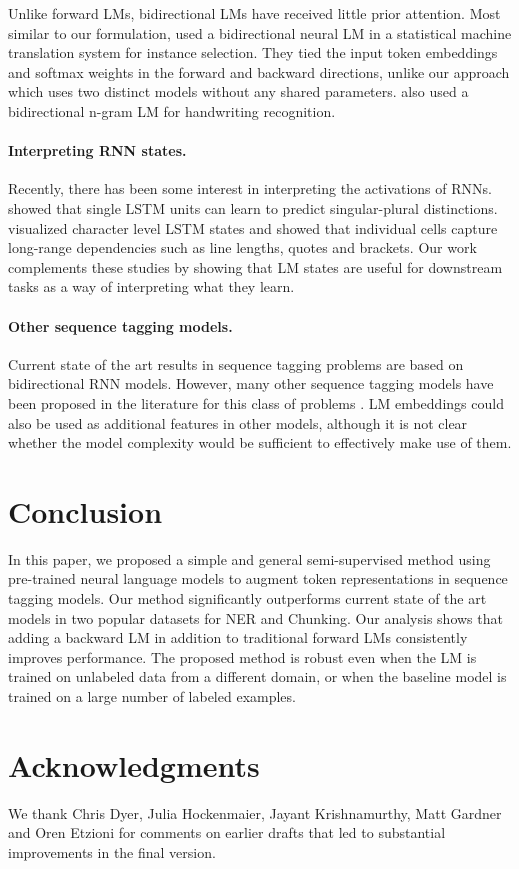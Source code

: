 \documentclass[11pt,a4paper]{article}
\begin{document}
Unlike forward LMs, bidirectional LMs have received little prior attention.
Most similar to our formulation, \citet{Peris2015ABR} used a bidirectional
neural LM in a statistical machine translation system for instance selection.
They tied the input token embeddings and softmax weights in
the forward and backward directions, unlike our approach which uses
two distinct models without any shared parameters.
\citet{frinken:12} also used a bidirectional n-gram LM for
handwriting recognition.



\paragraph{Interpreting RNN states.}
Recently, there has been some interest in interpreting the activations of RNNs. \citet{Linzen2016AssessingTA} showed that single LSTM units
can learn to predict singular-plural distinctions.  \citet{Karpathy2015VisualizingAU} visualized character level LSTM states and showed that individual cells capture long-range dependencies such as line lengths, quotes and brackets.  Our work complements these studies by showing that LM states are useful for downstream tasks as a way of interpreting what they learn.

\paragraph{Other sequence tagging models.}
Current state of the art results in sequence tagging problems are based on bidirectional RNN models.
However, many other sequence tagging models have been proposed in the literature for this class of problems \citep[e.g.,][]{CRF:Lafferty2001,collins:02}. 
LM embeddings could also be used as additional features in other models, although it is not clear whether the model complexity would be sufficient to effectively make use of them.



\section{Conclusion}
In this paper, we proposed a simple and general semi-supervised method using pre-trained neural language models to augment token representations in sequence tagging models.
Our method significantly outperforms current state of the art models in two popular datasets for NER and Chunking. 
Our analysis shows that adding a backward LM in addition to traditional forward LMs consistently improves performance.
The proposed method is robust even when the LM is trained on unlabeled data from a different domain, or when the baseline model is trained on a large number of labeled examples.







\section*{Acknowledgments}
We thank Chris Dyer, Julia Hockenmaier, Jayant Krishnamurthy, Matt Gardner and Oren Etzioni for comments on earlier drafts that led to substantial improvements in the final version.  



\end{document}
